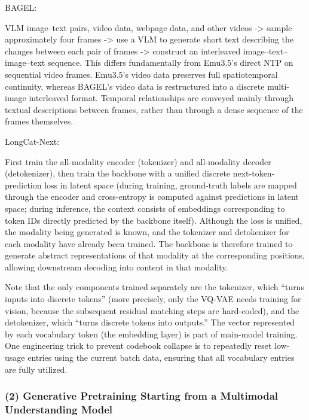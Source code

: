 BAGEL:

VLM image--text pairs, video data, webpage data, and other videos -\textgreater{} sample approximately four frames -\textgreater{} use a VLM to generate short text describing the changes between each pair of frames -\textgreater{} construct an interleaved image--text--image--text sequence. This differs fundamentally from Emu3.5's direct NTP on sequential video frames. Emu3.5's video data preserves full spatiotemporal continuity, whereas BAGEL's video data is restructured into a discrete multi-image interleaved format. Temporal relationships are conveyed mainly through textual descriptions between frames, rather than through a dense sequence of the frames themselves.

LongCat-Next:

First train the all-modality encoder (tokenizer) and all-modality decoder (detokenizer), then train the backbone with a unified discrete next-token-prediction loss in latent space (during training, ground-truth labels are mapped through the encoder and cross-entropy is computed against predictions in latent space; during inference, the context consists of embeddings corresponding to token IDs directly predicted by the backbone itself). Although the loss is unified, the modality being generated is known, and the tokenizer and detokenizer for each modality have already been trained. The backbone is therefore trained to generate abstract representations of that modality at the corresponding positions, allowing downstream decoding into content in that modality.

Note that the only components trained separately are the tokenizer, which ``turns inputs into discrete tokens'' (more precisely, only the VQ-VAE needs training for vision, because the subsequent residual matching steps are hard-coded), and the detokenizer, which ``turns discrete tokens into outputs.'' The vector represented by each vocabulary token (the embedding layer) is part of main-model training. One engineering trick to prevent codebook collapse is to repeatedly reset low-usage entries using the current batch data, ensuring that all vocabulary entries are fully utilized.

\hypertarget{generative-pretraining-starting-from-a-multimodal-understanding-model}{%
\subsubsection{(2) Generative Pretraining Starting from a Multimodal Understanding Model}\label{generative-pretraining-starting-from-a-multimodal-understanding-model}}


